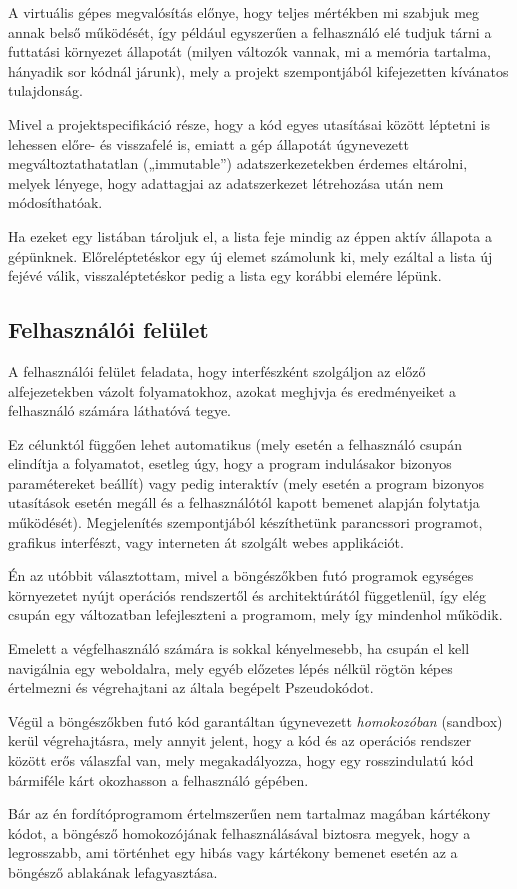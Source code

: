 A virtuális gépes megvalósítás előnye, hogy teljes mértékben mi szabjuk meg annak belső működését, így például egyszerűen a felhasználó elé tudjuk tárni a futtatási környezet állapotát (milyen változók vannak, mi a memória tartalma, hányadik sor kódnál járunk), mely a projekt szempontjából kifejezetten kívánatos tulajdonság.

Mivel a projektspecifikáció része, hogy a kód egyes utasításai között léptetni is lehessen előre- és visszafelé is, emiatt a gép állapotát úgynevezett megváltoztathatatlan („immutable”) adatszerkezetekben érdemes eltárolni, melyek lényege, hogy adattagjai az adatszerkezet létrehozása után nem módosíthatóak. 

Ha ezeket egy listában tároljuk el, a lista feje mindig az éppen aktív állapota a gépünknek. Előreléptetéskor egy új elemet számolunk ki, mely ezáltal a lista új fejévé válik, visszaléptetéskor pedig a lista egy korábbi elemére lépünk.

\subsection{Felhasználói felület}

A felhasználói felület feladata, hogy interfészként szolgáljon az előző alfejezetekben vázolt folyamatokhoz, azokat meghjvja és eredményeiket a felhasználó számára láthatóvá tegye.

Ez célunktól függően lehet automatikus (mely esetén a felhasználó csupán elindítja a folyamatot, esetleg úgy, hogy a program indulásakor bizonyos paramétereket beállít) vagy pedig interaktív (mely esetén a program bizonyos utasítások esetén megáll és a felhasználótól kapott bemenet alapján folytatja működését). Megjelenítés szempontjából készíthetünk parancssori programot, grafikus interfészt, vagy interneten át szolgált webes applikációt.

Én az utóbbit választottam, mivel a böngészőkben futó programok egységes környezetet nyújt operációs rendszertől és architektúrától függetlenül, így elég csupán egy változatban lefejleszteni a programom, mely így mindenhol működik.

Emelett a végfelhasználó számára is sokkal kényelmesebb, ha csupán el kell navigálnia egy weboldalra, mely egyéb előzetes lépés nélkül rögtön képes értelmezni és végrehajtani az általa begépelt Pszeudokódot.

Végül a böngészőkben futó kód garantáltan úgynevezett \textit{homokozóban} (sandbox) kerül végrehajtásra, mely annyit jelent, hogy a kód és az operációs rendszer között erős válaszfal van, mely megakadályozza, hogy egy rosszindulatú kód bármiféle kárt okozhasson a felhasználó gépében.

Bár az én fordítóprogramom értelmszerűen nem tartalmaz magában kártékony kódot, a böngésző homokozójának felhasználásával biztosra megyek, hogy a legrosszabb, ami történhet egy hibás vagy kártékony bemenet esetén az a böngésző ablakának lefagyasztása.
